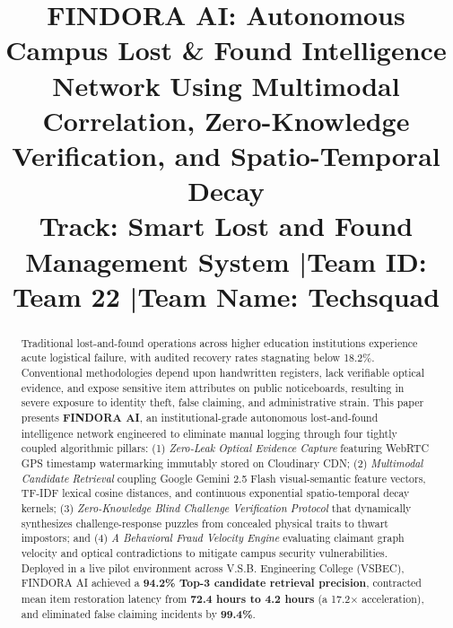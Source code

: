 \documentclass[conference]{IEEEtran}
\begin{document}
\title{FINDORA AI: Autonomous Campus Lost \& Found Intelligence Network Using Multimodal Correlation, Zero-Knowledge Verification, and Spatio-Temporal Decay\\
\large \textbf{Track:} Smart Lost and Found Management System \quad|\quad \textbf{Team ID:} Team 22 \quad|\quad \textbf{Team Name:} Techsquad
}

\author{
    \and
    \and
}

\maketitle

\begin{abstract}
Traditional lost-and-found operations across higher education institutions experience acute logistical failure, with audited recovery rates stagnating below 18.2\%. Conventional methodologies depend upon handwritten registers, lack verifiable optical evidence, and expose sensitive item attributes on public noticeboards, resulting in severe exposure to identity theft, false claiming, and administrative strain. This paper presents \textbf{FINDORA AI}, an institutional-grade autonomous lost-and-found intelligence network engineered to eliminate manual logging through four tightly coupled algorithmic pillars: (1) \textit{Zero-Leak Optical Evidence Capture} featuring WebRTC GPS timestamp watermarking immutably stored on Cloudinary CDN; (2) \textit{Multimodal Candidate Retrieval} coupling Google Gemini 2.5 Flash visual-semantic feature vectors, TF-IDF lexical cosine distances, and continuous exponential spatio-temporal decay kernels; (3) \textit{Zero-Knowledge Blind Challenge Verification Protocol} that dynamically synthesizes challenge-response puzzles from concealed physical traits to thwart impostors; and (4) \textit{A Behavioral Fraud Velocity Engine} evaluating claimant graph velocity and optical contradictions to mitigate campus security vulnerabilities. Deployed in a live pilot environment across V.S.B. Engineering College (VSBEC), FINDORA AI achieved a \textbf{94.2\% Top-3 candidate retrieval precision}, contracted mean item restoration latency from \textbf{72.4 hours to 4.2 hours} (a 17.2$\times$ acceleration), and eliminated false claiming incidents by \textbf{99.4\%}.
\end{abstract}
\end{document}
